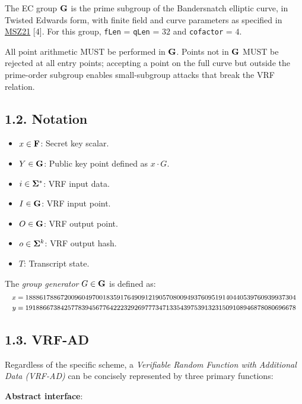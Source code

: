 \documentclass[
]{article}
\providecommand{\tightlist}{%
  \setlength{\itemsep}{0pt}\setlength{\parskip}{0pt}}
\begin{document}
The EC group \(\bold{G}\) is the prime subgroup of the Bandersnatch
elliptic curve, in Twisted Edwards form, with finite field and curve
parameters as specified in
\href{https://eprint.iacr.org/2021/1152}{MSZ21} {[}4{]}. For this group,
\texttt{fLen} = \texttt{qLen} = \(32\) and \texttt{cofactor} = \(4\).

All point arithmetic MUST be performed in \(\bold{G}\). Points not in
\(\bold{G}\) MUST be rejected at all entry points; accepting a point on
the full curve but outside the prime-order subgroup enables
small-subgroup attacks that break the VRF relation.

\subsection{1.2. Notation}\label{notation}

\begin{itemize}
\tightlist
\item
  \(x \in \bold{F}\): Secret key scalar.
\item
  \(Y \in \bold{G}\): Public key point defined as \(x \cdot G\).
\item
  \(i \in \bold{\Sigma}^*\): VRF input data.
\item
  \(I \in \bold{G}\): VRF input point.
\item
  \(O \in \bold{G}\): VRF output point.
\item
  \(o \in \bold{\Sigma}^k\): VRF output hash.
\item
  \(T\): Transcript state.
\end{itemize}

The \emph{group generator} \(G \in \bold{G}\) is defined as:
\[\footnotesize\begin{aligned}
x &= 18886178867200960497001835917649091219057080094937609519140440539760939937304 \\
y &= 19188667384257783945677642223292697773471335439753913231509108946878080696678
\end{aligned}\]

\subsection{1.3. VRF-AD}\label{vrf-ad}

Regardless of the specific scheme, a \emph{Verifiable Random Function
with Additional Data (VRF-AD)} can be concisely represented by three
primary functions:

\textbf{Abstract interface}:
\end{document}
